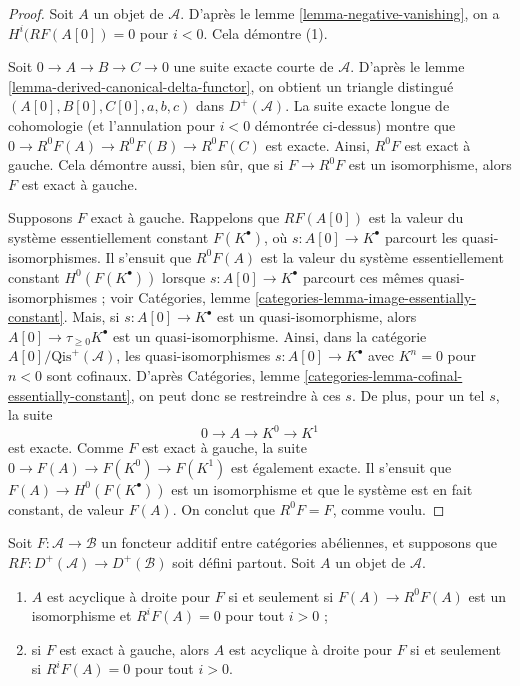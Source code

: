 \begin{proof}
Soit $A$ un objet de $\mathcal{A}$. D'après le
lemme \ref{lemma-negative-vanishing}, on a
$H^i(RF(A[0]) = 0$ pour $i < 0$. Cela démontre (1).

\medskip\noindent
Soit $0 \to A \to B \to C \to 0$ une suite exacte courte de $\mathcal{A}$.
D'après le lemme \ref{lemma-derived-canonical-delta-functor}, on obtient un
triangle distingué $(A[0], B[0], C[0], a, b, c)$ dans
$D^{+}(\mathcal{A})$. La suite exacte longue de cohomologie (et l'annulation
pour $i < 0$ démontrée ci-dessus) montre que
$0 \to R^0F(A) \to R^0F(B) \to R^0F(C)$ est exacte. Ainsi, $R^0F$ est exact à
gauche. Cela démontre aussi, bien sûr, que si $F \to R^0F$ est un
isomorphisme, alors $F$ est exact à gauche.

\medskip\noindent
Supposons $F$ exact à gauche. Rappelons que $RF(A[0])$ est la valeur du système
essentiellement constant $F(K^\bullet)$, où
$s : A[0] \to K^\bullet$ parcourt les quasi-isomorphismes. Il s'ensuit que
$R^0F(A)$ est la valeur du système essentiellement constant
$H^0(F(K^\bullet))$ lorsque $s : A[0] \to K^\bullet$ parcourt ces mêmes
quasi-isomorphismes ; voir Catégories,
lemme \ref{categories-lemma-image-essentially-constant}. Mais, si
$s : A[0] \to K^\bullet$ est un quasi-isomorphisme, alors
$A[0] \to \tau_{\geq 0}K^\bullet$ est un quasi-isomorphisme. Ainsi, dans la
catégorie $A[0]/\text{Qis}^{+}(\mathcal{A})$, les quasi-isomorphismes
$s : A[0] \to K^\bullet$ avec $K^n = 0$ pour $n < 0$ sont cofinaux. D'après
Catégories, lemme \ref{categories-lemma-cofinal-essentially-constant}, on peut
donc se restreindre à ces $s$. De plus, pour un tel $s$, la suite
$$
0 \to A \to K^0 \to K^1
$$
est exacte. Comme $F$ est exact à gauche, la suite
$0 \to F(A) \to F(K^0) \to F(K^1)$ est également exacte. Il s'ensuit que
$F(A) \to H^0(F(K^\bullet))$ est un isomorphisme et que le système est en fait
constant, de valeur $F(A)$. On conclut que $R^0F = F$, comme voulu.
\end{proof}

\begin{lemma}
\label{lemma-F-acyclic}
Soit $F : \mathcal{A} \to \mathcal{B}$ un foncteur additif entre catégories
abéliennes, et supposons que
$RF : D^{+}(\mathcal{A}) \to D^{+}(\mathcal{B})$ soit défini partout. Soit
$A$ un objet de $\mathcal{A}$.
\begin{enumerate}
\item $A$ est acyclique à droite pour $F$ si et seulement si
$F(A) \to R^0F(A)$ est un isomorphisme et $R^iF(A) = 0$ pour tout $i > 0$ ;
\item si $F$ est exact à gauche, alors $A$ est acyclique à droite pour $F$ si
et seulement si $R^iF(A) = 0$ pour tout $i > 0$.
\end{enumerate}
\end{lemma}

